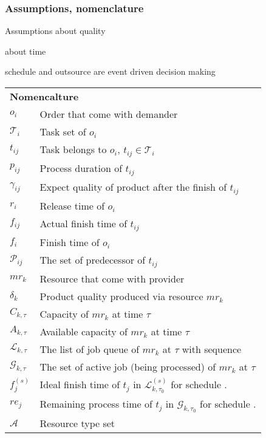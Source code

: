 
\subsubsection{Assumptions, nomenclature} %
\label{ssub:assumptions_nomenclature}
Assumptions about quality

about time

schedule and outsource are event driven decision making 

\begin{table}[htbp]
\begin{tabularx}{\textwidth}{|lX|}
    \hline
    \multicolumn{2}{|l|}{\multirow{2}[0]{*}{\large\textbf{Nomencalture}}} \\
    \multicolumn{2}{|l|}{} \\
	$o_i$ & Order that come with demander \\
	$\mathcal{T}_i$ & Task set of $o_i$ \\
	$t_{ij}$ & Task belongs to $o_i$, $t_{ij}\in\mathcal{T}_i$ \\
	$p_{ij}$ & Process duration of $t_{ij}$\\
	$\gamma_{ij}$ & Expect quality of product after the finish of $t_{ij}$\\
	$r_i$ & Release time of $o_i$\\
	$f_{ij}$ & Actual finish time of $t_{ij}$ \\
	$f_{i}$ & Finish time of $o_i$\\
	$\mathcal{P}_{ij}$ & The set of predecessor of $t_{ij}$\\
	$mr_k$ & Resource that come with provider \\
	$\delta_k$ & Product quality produced via resource $mr_k$ \\
	$C_{k,\tau}$ & Capacity of $mr_k$ at time $\tau$\\
	$A_{k,\tau}$ & Available capacity of $mr_k$ at time $\tau$\\
	$\mathcal{L}_{k,\tau}$ & The list of job queue of $mr_k$ at $\tau$ with sequence\\
	$\mathcal{G}_{k,\tau}$ & The set of active job (being processed) of $mr_k$ at $\tau$ \\ 
	$f^{(s)}_j$ & Ideal finish time of $t_j$ in $\mathcal{L}^{(s)}_{k,\tau_0}$ for schedule . \\
	$re_j$ & Remaining process time of $t_j$ in $\mathcal{G}_{k,\tau_0}$ for schedule . \\
	$\mathcal{A}$ & Resource type set \\

\end{tabularx}
\end{table}
